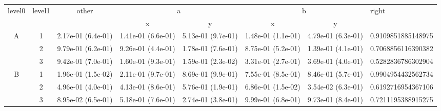 \begin{tabular}{cccccccl}
\toprule
\multirow{2}{*}{level0} & \multirow{2}{*}{level1}& \multirow{2}{*}{other}&\multicolumn{2}{c}{a}&\multicolumn{2}{c}{b}& \multirow{2}{*}{right}\tabularnewline
\cmidrule(lr){4-5}
\cmidrule(lr){6-7}
&&&x&y&x&y\tabularnewline
\midrule
\multirow{3}{*}{A}&1& 2.17e-01 (6.4e-01)& 1.41e-01 (6.6e-01)& 5.13e-01 (9.7e-01)& 1.48e-01 (1.1e-01)& 4.79e-01 (6.3e-01)& 0.9109851885148975\tabularnewline
&2& 9.79e-01 (6.2e-01)& 9.26e-01 (4.4e-01)& 1.78e-01 (7.6e-01)& 8.75e-01 (5.2e-01)& 1.39e-01 (4.1e-01)& 0.7068856116390382\tabularnewline
&3& 9.42e-01 (7.0e-01)& 1.60e-01 (9.3e-01)& 1.59e-01 (2.3e-02)& 3.31e-01 (2.7e-01)& 3.69e-01 (4.0e-01)& 0.5282836786302904\tabularnewline
\midrule
\multirow{3}{*}{B}&1& 1.96e-01 (1.5e-02)& 2.11e-01 (9.7e-01)& 8.69e-01 (9.9e-01)& 7.55e-01 (8.5e-01)& 8.46e-01 (5.7e-01)& 0.9904954432562734\tabularnewline
&2& 4.96e-01 (4.0e-01)& 4.13e-01 (8.6e-01)& 5.76e-01 (1.9e-01)& 6.86e-01 (1.5e-02)& 3.54e-02 (6.3e-01)& 0.6192716954367106\tabularnewline
&3& 8.95e-02 (6.5e-01)& 5.18e-01 (7.6e-01)& 2.74e-01 (3.8e-01)& 9.99e-01 (6.8e-01)& 9.73e-01 (8.4e-01)& 0.7211195388915275\tabularnewline
\bottomrule
\end{tabular}
